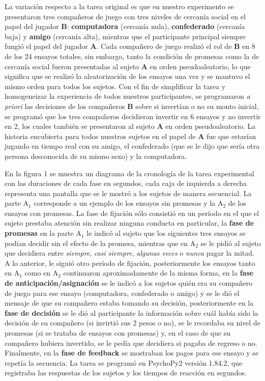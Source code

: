 \documentclass[]{article}
\begin{document}
La variación respecto a la tarea original es que en nuestro experimento
se presentaron tres compañeros de juego con tres niveles de cercanía
social en el papel del jugador \textbf{B}: \textbf{computadora}
(cercanía nula), \textbf{confederado} (cercanía baja) y \textbf{amigo}
(cercanía alta), mientras que el participante principal siempre fungió
el papel del jugador \textbf{A}. Cada compañero de juego realizó el rol
de \textbf{B} en 8 de los 24 ensayos totales, sin embargo, tanto la
condición de promesas como la de cercanía social fueron presentadas al
sujeto \textbf{A} en orden pseudoaleatorio, lo que significa que se
realizó la aleatorización de los ensayos una vez y se mantuvo el mismo
orden para todos los sujetos. Con el fin de simplificar la tarea y
homogeneizar la experiencia de todos nuestros participantes, se
programaron \emph{a priori} las decisiones de los compañeros \textbf{B}
sobre si invertían o no su monto inicial, se programó que los tres
compañeros decidieran invertir en 6 ensayos y no invertir en 2, los
cuales también se presentaron al sujeto \textbf{A} en orden
pseudoaleatorio. La historia encubierta para todos nuestros sujetos en
el papel de \textbf{A} fue que estarían jugando en tiempo real con su
amigo, el confederado (que se le dijo que sería otra persona desconocida
de su mismo sexo) y la computadora.

En la figura 1 se muestra un diagrama de la cronología de la tarea
experimental con las duraciones de cada fase en segundos, cada caja de
izquierda a derecha representa una pantalla que se le mostró a los
sujetos de manera secuencial. La parte A\(_{1}\) corresponde a un
ejemplo de los ensayos sin promesas y la A\(_{2}\) de los ensayos con
promesas. La fase de fijación sólo consistió en un período en el que el
sujeto prestaba atención sin realizar ninguna conducta en particular, la
\textbf{fase de promesas} en la parte A\(_{1}\) le indicó al sujeto que
los siguientes tres ensayos se podían decidir sin el efecto de la
promesa, mientras que en A\(_{2}\) se le pidió al sujeto que decidiera
entre \emph{siempre}, \emph{casi siempre}, \emph{algunas veces} o
\emph{nunca} pagar la mitad. A lo anterior, le siguió otro período de
fijación, posteriormente los ensayos tanto en A\(_{1}\) como en
A\(_{2}\) continuaron aproximadamente de la misma forma, en la
\textbf{fase de anticipación/asignación} se le indicó a los sujetos
quién era su compañero de juego para ese ensayo (computadora,
confederado o amigo) y se le dió el mensaje de que su compañero estaba
tomando su decisión, posteriormente en la \textbf{fase de decisión} se
le dió al participante la información sobre cuál había sido la decisión
de su compañero (si invirtió sus 2 pesos o no), se le recordaba su nivel
de promesas (si se trataba de ensayos con promesas) y, en el caso de que
su compañero hubiera invertido, se le pedía que decidiera si pagaba de
regreso o no. Finalmente, en la \textbf{fase de feedback} se mostraban
los pagos para ese ensayo y se repetía la secuencia. La tarea se
programó en PsychoPy2 versión 1.84.2, que registraba las respuestas de
los sujetos y los tiempos de reacción en segundos.
\end{document}
